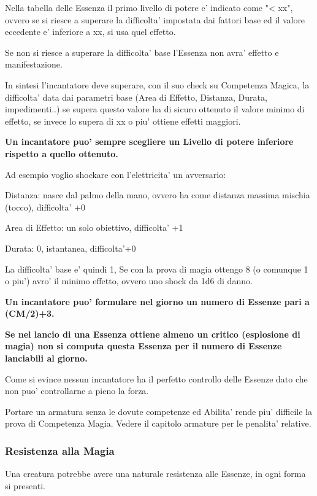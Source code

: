 \documentclass[a4paper,11pt,twoside,openany]{book}
\begin{document}
Nella tabella delle Essenza il primo livello di potere e' indicato come "< xx", ovvero se si riesce a superare la difficolta' impostata dai fattori base ed il valore eccedente e' inferiore a xx, si usa quel effetto.

Se non si riesce a superare la difficolta' base l'Essenza non avra' effetto e manifestazione.

In sintesi l'incantatore deve superare, con il suo check su Competenza Magica, la difficolta' data dai parametri base (Area di Effetto, Distanza, Durata, impedimenti..) se supera questo valore ha di sicuro ottenuto il valore minimo di effetto, se invece lo supera di xx o piu' ottiene effetti maggiori.

\bigskip

 \textbf{Un incantatore puo' sempre scegliere un Livello di potere
inferiore rispetto a quello ottenuto.}

Ad esempio voglio shockare con l'elettricita' un avversario:

Distanza: nasce dal palmo della mano, ovvero ha come distanza massima mischia (tocco), difficolta' +0

Area di Effetto: un solo obiettivo, difficolta' +1

Durata: 0, istantanea, difficolta'+0

La difficolta' base e' quindi 1, Se con la prova di magia ottengo 8 (o comunque 1 o piu') avro' il minimo effetto, ovvero uno shock da 1d6 di danno.

\bigskip

\textbf{Un incantatore puo' formulare nel giorno un numero di Essenze pari a (CM/2)+3.}

\textbf{Se nel lancio di una Essenza ottiene almeno un critico (esplosione di magia) non si computa questa Essenza per il numero di Essenze lanciabili al giorno.}

Come si evince nessun incantatore ha il perfetto controllo delle Essenze dato che non puo' controllarne a pieno la forza.

Portare un armatura senza le dovute competenze ed Abilita' rende piu' difficile la prova di Competenza Magia. Vedere il capitolo armature per le penalita' relative.

\subsubsection{Resistenza alla Magia}

Una creatura potrebbe avere una naturale resistenza alle Essenze, in ogni forma si presenti.
\end{document}
